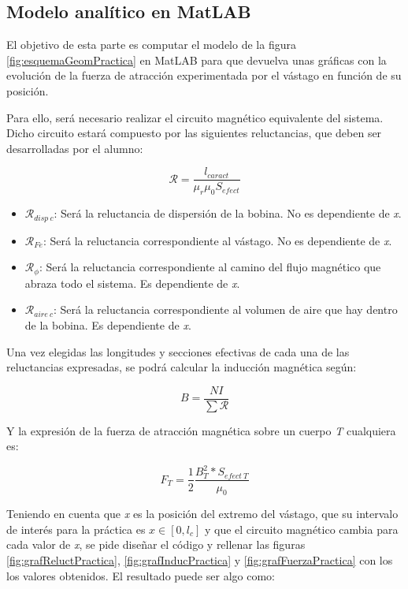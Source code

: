 \subsection*{Modelo analítico en MatLAB}

El objetivo de esta parte es computar el modelo de la figura \ref{fig:esquemaGeomPractica} en MatLAB para que devuelva unas gráficas con la evolución de la fuerza de atracción experimentada por el vástago en función de su posición.

Para ello, será necesario realizar el circuito magnético equivalente del sistema. Dicho circuito estará compuesto por las siguientes reluctancias, que deben ser desarrolladas por el alumno:

\[\mathcal{R} = \frac{l_{caract}}{\mu_r\mu_0 S_{efect}}\]

\begin{itemize}
    \item \(\mathcal{R}_{disp~c}\): Será la reluctancia de dispersión de la bobina. No es dependiente de \textit{x}.
    \item \(\mathcal{R}_{Fe}\): Será la reluctancia correspondiente al vástago. No es dependiente de \textit{x}.
    \item \(\mathcal{R}_{\phi}\): Será la reluctancia correspondiente al camino del flujo magnético que abraza todo el sistema. Es dependiente de \textit{x}.
    \item \(\mathcal{R}_{aire~c}\): Será la reluctancia correspondiente al volumen de aire que hay dentro de la bobina. Es dependiente de \textit{x}.
\end{itemize}

Una vez elegidas las longitudes y secciones efectivas de cada una de las reluctancias expresadas, se podrá calcular la inducción magnética según:

\[B = \frac{NI}{\sum\mathcal{R}}\]

Y la expresión de la fuerza de atracción magnética sobre un cuerpo \textit{T} cualquiera es:

\[F_T = \frac{1}{2} \frac{B_T^2*S_{efect~T}}{\mu_0}\]

Teniendo en cuenta que \textit{x} es la posición del extremo del vástago, que su intervalo de interés para la práctica es \(x\in [0, l_c]\) y que el circuito magnético cambia para cada valor de \textit{x}, se pide diseñar el código y rellenar las figuras \ref{fig:grafReluctPractica}, \ref{fig:grafInducPractica} y \ref{fig:grafFuerzaPractica} con los los valores obtenidos. El resultado puede ser algo como:


